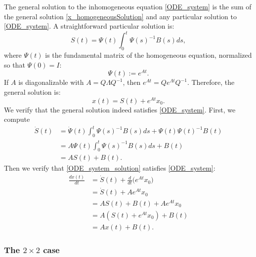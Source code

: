 \documentclass[../../lecture_notes.tex]{subfiles}
\begin{document}
The general solution to the inhomogeneous equation \eqref{ODE_system} is the sum of the general solution \eqref{x_homogeneousSolution} and any particular solution to \eqref{ODE_system}.
A straightforward particular solution is:
\begin{equation*}
  S(t)=\Psi(t)\int_{0}^{t}\Psi(s)^{-1}B(s)ds,
\end{equation*}
where $\Psi(t)$ is the fundamental matrix of the homogeneous equation, normalized so that $\Psi(0)=I$:
\begin{equation*}
  \Psi(t):= e^{At}.
\end{equation*}
If $A$ is diagonalizable with $A=Q\Lambda Q^{-1}$, then $e^{At}=Qe^{\Lambda t}Q^{-1}$.
Therefore, the general solution is:
\begin{equation}
  x(t)=S(t)+e^{At}x_{0}.
  \label{ODE_system_solution}
\end{equation}
We verify that the general solution indeed satisfies \eqref{ODE_system}.
First, we compute
\begin{align*}
  \dot{S}(t) &=\dot{\Psi}(t)\int_{0}^{t}\Psi(s)^{-1}B(s)ds+\Psi(t)\Psi(t)^{-1}B(t) \\
  &=A\Psi(t)\int_{0}^{t}\Psi(s)^{-1}B(s)ds+B(t) \\
  &=AS(t)+B(t).
\end{align*}
Then we verify that \eqref{ODE_system_solution} satisfies \eqref{ODE_system}:
\begin{align*}
  \frac{dx(t)}{dt} &=\dot{S}(t)+\frac{d}{dt}\big(e^{At}x_{0}\big) \\
  &=\dot{S}(t)+Ae^{At}x_{0} \\
  &=AS(t)+B(t)+Ae^{At}x_{0} \\
  &=A\left( S(t)+e^{At}x_{0}\right) +B(t) \\
  &=Ax(t)+B(t).
\end{align*}

\subsubsection{The $2\times 2$ case}
\end{document}
